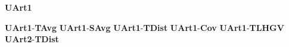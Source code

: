 \Large
\centerline{\textbf{UArt1}}
\normalsize
\textbf{UArt1}-\textbf{TAvg}
\textbf{UArt1}-\textbf{SAvg}
\textbf{UArt1}-\textbf{TDist}
\textbf{UArt1}-\textbf{Cov}
\textbf{UArt1}-\textbf{TLHGV}
\textbf{UArt2}-\textbf{TDist}





